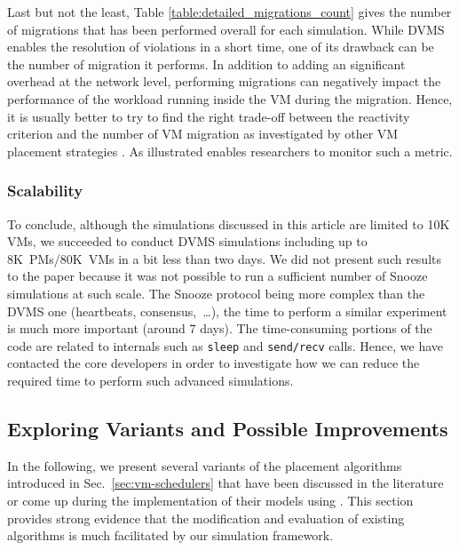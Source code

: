 Last but not the least, Table \ref{table:detailed_migrations_count}
gives the number of migrations that has been performed overall for
each simulation. While
DVMS enables the resolution of violations in a short time, one of its
drawback can be the number of migration it performs. In addition to
adding an significant overhead at the network level, performing
migrations can negatively impact the performance of the workload
running inside the VM during the migration. Hence, it is usually
better to try to find the right trade-off between the reactivity
criterion and the number of VM migration as investigated by other VM
placement strategies \cite{eyraud:ipdps2013}. As illustrated \vmps
enables researchers to monitor such a metric.

\subsubsection{\vmps Scalability}
To conclude, although the simulations discussed in this article are
limited to 10K VMs, we succeeded to conduct DVMS simulations including
up to 8K~PMs/80K~VMs in a bit less than two days. We did not present
such results to the paper because it was not possible to run a
sufficient number of Snooze simulations at such scale. The Snooze
protocol being more complex than the DVMS one (heartbeats,
consensus,~\ldots), the time to perform a similar experiment is much
more important (around 7 days). The time-consuming portions of the
code are related to \sg internals such as \texttt{sleep} and
\texttt{send/recv} calls. Hence, we have contacted the \sg core
developers in order to investigate how we can reduce the required time
to perform such advanced simulations.


\subsection{Exploring Variants and Possible Improvements}


In the following, we present several variants of
the placement algorithms introduced in Sec.~\ref{sec:vm-schedulers}
that have been discussed in the literature or come up during the
implementation of their models using \vmps. This section provides
strong evidence that the modification and evaluation of existing
algorithms is much facilitated by our simulation framework.

